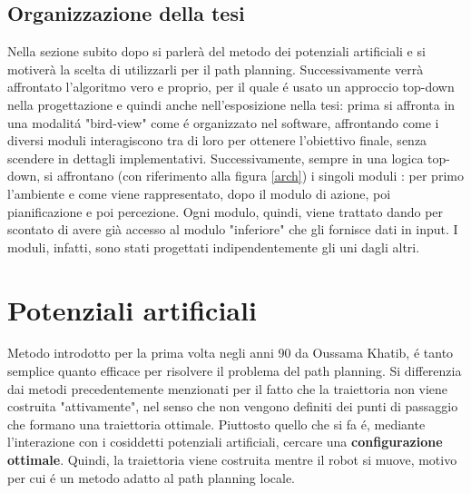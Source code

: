 \documentclass[14pt,a4paper]{extarticle}
\begin{document}
\subsection{Organizzazione della tesi} 
Nella sezione subito dopo si parlerà del metodo dei potenziali artificiali e si motiverà la scelta di utilizzarli per il path planning. Successivamente verrà affrontato l'algoritmo vero e proprio, per il quale é usato un approccio top-down nella progettazione e quindi anche nell'esposizione nella tesi: prima si affronta in una modalitá "bird-view" come é organizzato nel software, affrontando come i diversi moduli interagiscono tra di loro per ottenere l'obiettivo finale, senza scendere in dettagli implementativi. Successivamente, sempre in una logica top-down, si affrontano (con riferimento alla figura \ref{arch}) i singoli moduli : per primo l'ambiente e come viene rappresentato, dopo il modulo di azione, poi pianificazione e poi percezione. Ogni modulo, quindi, viene trattato dando per scontato di avere già accesso al modulo "inferiore" che gli fornisce dati in input. I moduli, infatti, sono stati progettati indipendentemente gli uni dagli altri.

\newpage
\section{Potenziali artificiali}

Metodo introdotto per la prima volta negli anni 90 da Oussama Khatib, é tanto semplice quanto efficace per risolvere il problema del path planning. Si differenzia dai metodi precedentemente menzionati per il fatto che la traiettoria non viene costruita "attivamente", nel senso che non vengono definiti dei punti di passaggio che formano una traiettoria ottimale. Piuttosto quello che si fa é, mediante l'interazione con i cosiddetti potenziali artificiali, cercare una \textbf{configurazione ottimale}. Quindi, la traiettoria viene costruita mentre il robot si muove, motivo per cui é un metodo adatto al path planning locale.
\end{document}
